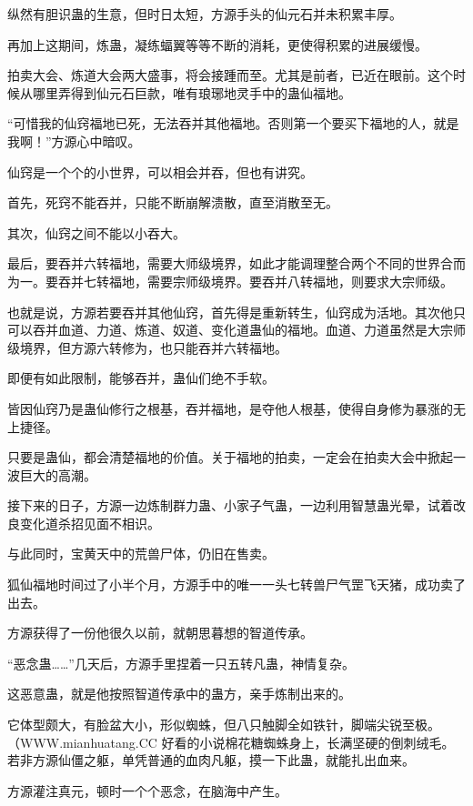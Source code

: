 
\begin{this_body}

纵然有胆识蛊的生意，但时日太短，方源手头的仙元石并未积累丰厚。

再加上这期间，炼蛊，凝练蝠翼等等不断的消耗，更使得积累的进展缓慢。

拍卖大会、炼道大会两大盛事，将会接踵而至。尤其是前者，已近在眼前。这个时候从哪里弄得到仙元石巨款，唯有琅琊地灵手中的蛊仙福地。

“可惜我的仙窍福地已死，无法吞并其他福地。否则第一个要买下福地的人，就是我啊！”方源心中暗叹。

仙窍是一个个的小世界，可以相会并吞，但也有讲究。

首先，死窍不能吞并，只能不断崩解溃散，直至消散至无。

其次，仙窍之间不能以小吞大。

最后，要吞并六转福地，需要大师级境界，如此才能调理整合两个不同的世界合而为一。要吞并七转福地，需要宗师级境界。要吞并八转福地，则要求大宗师级。

也就是说，方源若要吞并其他仙窍，首先得是重新转生，仙窍成为活地。其次他只可以吞并血道、力道、炼道、奴道、变化道蛊仙的福地。血道、力道虽然是大宗师级境界，但方源六转修为，也只能吞并六转福地。

即便有如此限制，能够吞并，蛊仙们绝不手软。

皆因仙窍乃是蛊仙修行之根基，吞并福地，是夺他人根基，使得自身修为暴涨的无上捷径。

只要是蛊仙，都会清楚福地的价值。关于福地的拍卖，一定会在拍卖大会中掀起一波巨大的高潮。

接下来的日子，方源一边炼制群力蛊、小家子气蛊，一边利用智慧蛊光晕，试着改良变化道杀招见面不相识。

与此同时，宝黄天中的荒兽尸体，仍旧在售卖。

狐仙福地时间过了小半个月，方源手中的唯一一头七转兽尸气罡飞天猪，成功卖了出去。

方源获得了一份他很久以前，就朝思暮想的智道传承。

“恶念蛊……”几天后，方源手里捏着一只五转凡蛊，神情复杂。

这恶意蛊，就是他按照智道传承中的蛊方，亲手炼制出来的。

它体型颇大，有脸盆大小，形似蜘蛛，但八只触脚全如铁针，脚端尖锐至极。（WWW.mianhuatang.CC 好看的小说棉花糖蜘蛛身上，长满坚硬的倒刺绒毛。若非方源仙僵之躯，单凭普通的血肉凡躯，摸一下此蛊，就能扎出血来。

方源灌注真元，顿时一个个恶念，在脑海中产生。


\end{this_body}
